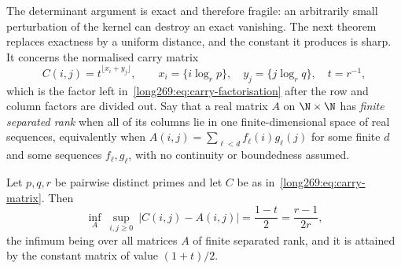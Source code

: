 The determinant argument is exact and therefore fragile: an arbitrarily small
perturbation of the kernel can destroy an exact vanishing.  The next theorem
replaces exactness by a uniform distance, and the constant it produces is
sharp.  It concerns the normalised carry matrix
\begin{equation}\label{long269:eq:carry-matrix}
 C(i,j)=t^{\lfloor x_i+y_j\rfloor},
 \qquad
 x_i=\{i\log_r p\},\quad y_j=\{j\log_r q\},\quad t=r^{-1},
\end{equation}
which is the factor left in~\eqref{long269:eq:carry-factorisation} after the row and
column factors are divided out.  Say that a real matrix $A$ on $\N\times\N$ has
\emph{finite separated rank} when all of its columns lie in one
finite-dimensional space of real sequences, equivalently when
$A(i,j)=\sum_{\ell<d}f_\ell(i)g_\ell(j)$ for some finite $d$ and some
sequences $f_\ell,g_\ell$, with no continuity or boundedness assumed.

\begin{theorem}\label{long269:res:uniform-rank}
Let $p,q,r$ be pairwise distinct primes and let $C$ be as
in~\eqref{long269:eq:carry-matrix}.  Then
\[
 \inf_{A}\ \sup_{i,j\ge0}\ |C(i,j)-A(i,j)|=\frac{1-t}{2}=\frac{r-1}{2r},
\]
the infimum being over all matrices $A$ of finite separated rank, and it is
attained by the constant matrix of value $(1+t)/2$.
\end{theorem}

